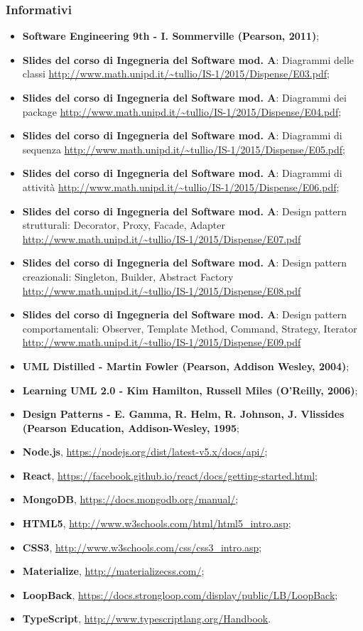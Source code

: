 \subsubsection{Informativi}
\begin{itemize}
\item \textbf{Software Engineering 9th - I. Sommerville (Pearson, 2011)};
\item \textbf{Slides del corso di Ingegneria del Software mod. A}: Diagrammi delle classi \url{http://www.math.unipd.it/~tullio/IS-1/2015/Dispense/E03.pdf};
\item \textbf{Slides del corso di Ingegneria del Software mod. A}: Diagrammi dei package \url{http://www.math.unipd.it/~tullio/IS-1/2015/Dispense/E04.pdf};
\item \textbf{Slides del corso di Ingegneria del Software mod. A}: Diagrammi di sequenza \url{http://www.math.unipd.it/~tullio/IS-1/2015/Dispense/E05.pdf};
\item \textbf{Slides del corso di Ingegneria del Software mod. A}: Diagrammi di attività \url{http://www.math.unipd.it/~tullio/IS-1/2015/Dispense/E06.pdf};
\item \textbf{Slides del corso di Ingegneria del Software mod. A}: Design pattern strutturali: Decorator, Proxy, Facade, Adapter \url{http://www.math.unipd.it/~tullio/IS-1/2015/Dispense/E07.pdf}
\item \textbf{Slides del corso di Ingegneria del Software mod. A}: Design pattern creazionali: Singleton, Builder, Abstract Factory \url{http://www.math.unipd.it/~tullio/IS-1/2015/Dispense/E08.pdf}
\item \textbf{Slides del corso di Ingegneria del Software mod. A}: Design pattern comportamentali: Observer, Template Method, Command, Strategy, Iterator \url{http://www.math.unipd.it/~tullio/IS-1/2015/Dispense/E09.pdf}
\item \textbf{UML Distilled - Martin Fowler (Pearson, Addison Wesley, 2004)};
\item \textbf{Learning UML 2.0 - Kim Hamilton, Russell Miles (O’Reilly, 2006)};
\item \textbf{Design Patterns - E. Gamma, R. Helm, R. Johnson, J. Vlissides (Pearson Education, Addison-Wesley, 1995};
\item \textbf{Node.js}, \url{https://nodejs.org/dist/latest-v5.x/docs/api/};
\item \textbf{React}, \url{https://facebook.github.io/react/docs/getting-started.html};
\item \textbf{MongoDB}, \url{https://docs.mongodb.org/manual/};
\item \textbf{HTML5}, \url{http://www.w3schools.com/html/html5\_intro.asp};
\item \textbf{CSS3}, \url{http://www.w3schools.com/css/css3\_intro.asp};
\item \textbf{Materialize}, \url{http://materializecss.com/};
\item \textbf{LoopBack}, \url{https://docs.strongloop.com/display/public/LB/LoopBack};
\item \textbf{TypeScript}, \url{http://www.typescriptlang.org/Handbook}.
\end{itemize}
